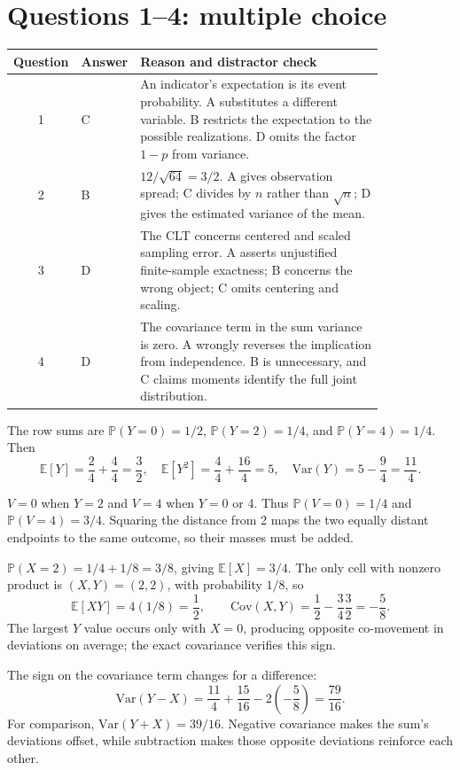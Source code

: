 \documentclass[11pt]{article}
\begin{document}
\section*{Questions 1--4: multiple choice}
\begin{tabular}{cp{0.08\linewidth}p{0.75\linewidth}}\toprule
Question & Answer & Reason and distractor check\\\midrule
1 & C & An indicator's expectation is its event probability. A substitutes a different variable. B restricts the expectation to the possible realizations. D omits the factor $1-p$ from variance.\\[5pt]
2 & B & $12/\sqrt{64}=3/2$. A gives observation spread; C divides by $n$ rather than $\sqrt n$; D gives the estimated variance of the mean.\\[5pt]
3 & D & The CLT concerns centered and scaled sampling error. A asserts unjustified finite-sample exactness; B concerns the wrong object; C omits centering and scaling.\\[5pt]
4 & D & The covariance term in the sum variance is zero. A wrongly reverses the implication from independence. B is unnecessary, and C claims moments identify the full joint distribution.\\\bottomrule
\end{tabular}

\begin{parts}
\item The row sums are $\mathbb P(Y=0)=1/2$, $\mathbb P(Y=2)=1/4$, and $\mathbb P(Y=4)=1/4$. Then
\[
\mathbb E[Y]=\frac24+\frac44=\frac32,\quad
\mathbb E[Y^2]=\frac44+\frac{16}4=5,\quad
\mathrm{Var}(Y)=5-\frac94=\frac{11}4.
\]
\item $V=0$ when $Y=2$ and $V=4$ when $Y=0$ or 4. Thus $\mathbb P(V=0)=1/4$ and $\mathbb P(V=4)=3/4$. Squaring the distance from 2 maps the two equally distant endpoints to the same outcome, so their masses must be added.
\item $\mathbb P(X=2)=1/4+1/8=3/8$, giving $\mathbb E[X]=3/4$. The only cell with nonzero product is $(X,Y)=(2,2)$, with probability $1/8$, so
\[
\mathbb E[XY]=4(1/8)=\frac12,\qquad
\mathrm{Cov}(X,Y)=\frac12-\frac34\frac32=-\frac58.
\]
The largest $Y$ value occurs only with $X=0$, producing opposite co-movement in deviations on average; the exact covariance verifies this sign.
\item The sign on the covariance term changes for a difference:
\[
\mathrm{Var}(Y-X)=\frac{11}4+\frac{15}{16}-2\left(-\frac58\right)=\frac{79}{16}.
\]
For comparison, $\mathrm{Var}(Y+X)=39/16$. Negative covariance makes the sum's deviations offset, while subtraction makes those opposite deviations reinforce each other.
\end{parts}
\end{document}
